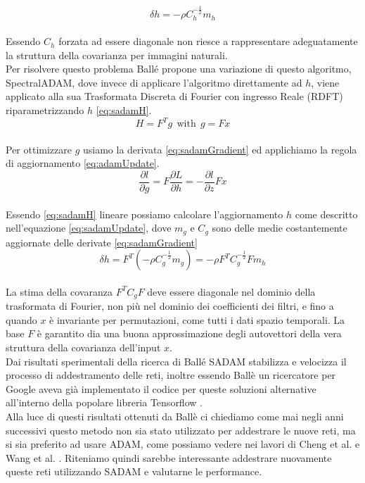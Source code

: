\begin{equation}\label{eq:adamUpdate}
\delta h = - \rho C_{h}^{-\tfrac{1}{2}} m_{h}
\end{equation}\\
Essendo $C_{h}$ forzata ad essere diagonale non riesce a rappresentare adeguatamente la struttura della covarianza per immagini naturali.\\
Per risolvere questo problema Ballé propone una variazione di questo algoritmo, SpectralADAM, dove invece di applicare l’algoritmo direttamente ad $h$, viene applicato alla sua Trasformata Discreta di Fourier con ingresso Reale (RDFT) riparametrizzando $h$ \ref{eq:sadamH}.\\
\begin{equation}\label{eq:sadamH}
H = F^{T} g \:\: \textrm{with} \:\: g = Fx
\end{equation}\\
Per ottimizzare $g$ usiamo la derivata \ref{eq:sadamGradient} ed applichiamo la regola di aggiornamento \ref{eq:adamUpdate}.\\
\begin{equation}\label{eq:sadamGradient}
\dfrac{\partial l}{\partial g} = F \dfrac{\partial L}{\partial h} = - \dfrac{\partial l}{\partial z} Fx
\end{equation}\\
Essendo \ref{eq:sadamH} lineare possiamo calcolare l’aggiornamento $h$ come descritto nell’equazione \ref{eq:sadamUpdate}, dove $m_{g}$ e $C_{g}$ sono delle medie costantemente aggiornate delle derivate \ref{eq:sadamGradient} \\
\begin{equation}\label{eq:sadamUpdate}
\delta h = F^{T} (-\rho C_{g}^{-\tfrac{1}{2}} m_{g}) = - \rho F^{T} C_{g}^{-\tfrac{1}{2}} Fm_{h}
\end{equation}\\
La stima della covaranza $ F^{T} C_{g} F$ deve essere diagonale nel dominio della trasformata di Fourier, non più nel dominio dei coefficienti dei filtri, e fino a quando $x$ è invariante per permutazioni, come tutti i dati spazio temporali. La base $F$ è garantito dia una buona approssimazione degli autovettori della vera struttura della covarianza dell’input $x$.\\
Dai risultati sperimentali della ricerca di Ballé SADAM stabilizza e velocizza il processo di addestramento delle reti, inoltre essendo Ballè un ricercatore per Google aveva già implementato il codice per queste soluzioni alternative all’interno della popolare libreria Tensorflow \cite{tensorflow2015-whitepaper}.\\
Alla luce di questi risultati ottenuti da Ballè ci chiediamo come mai negli anni successivi questo metodo non sia stato utilizzato per addestrare le nuove reti, ma si sia preferito ad usare ADAM, come possiamo vedere nei lavori di Cheng et al. \cite{cheng2020learned} e Wang et al. \cite{wang2022neural}. Riteniamo quindi sarebbe interessante addestrare nuovamente queste reti utilizzando SADAM e valutarne le performance.


